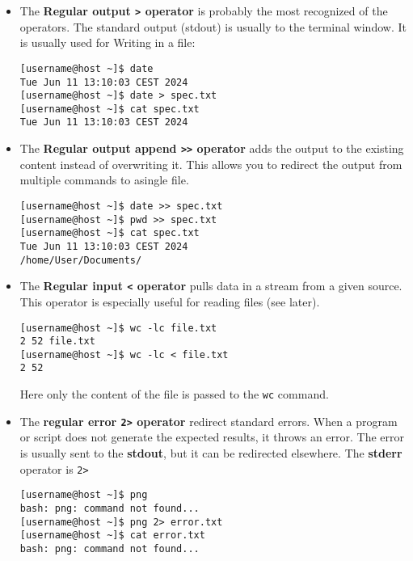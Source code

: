 \documentclass{article}
\newcommand{\inlinecode}[1]{\colorbox{backcolour}{\footnotesize{\texttt{#1}}}}
\begin{document}
\begin{itemize}
	\item The \textbf{Regular output \inlinecode{>} operator} is probably the most recognized of the operators. The standard output (stdout) is usually to the terminal window. It is usually used for Writing in a file:

	      \begin{lstlisting}[style=terminal]
[username@host ~]$ date
Tue Jun 11 13:10:03 CEST 2024
[username@host ~]$ date > spec.txt
[username@host ~]$ cat spec.txt
Tue Jun 11 13:10:03 CEST 2024
\end{lstlisting}

	\item The \textbf{Regular output append \inlinecode{>>} operator} adds the output to the existing content instead of overwriting it. This allows you to redirect the output from multiple commands to asingle file.

	      \begin{lstlisting}[style=terminal]
[username@host ~]$ date >> spec.txt
[username@host ~]$ pwd >> spec.txt
[username@host ~]$ cat spec.txt
Tue Jun 11 13:10:03 CEST 2024
/home/User/Documents/
\end{lstlisting}

	\item The \textbf{Regular input \inlinecode{<} operator} pulls data in a stream from a given source. This operator is especially useful for reading files (see later).
	      \begin{lstlisting}[style=terminal]
[username@host ~]$ wc -lc file.txt
2 52 file.txt
[username@host ~]$ wc -lc < file.txt
2 52
\end{lstlisting}

	      Here only the content of the file is passed to the \inlinecode{wc} command.

	\item The \textbf{regular error \inlinecode{2>} operator} redirect standard errors. When a program or script does not generate the expected results, it throws an error. The error is usually sent to the \textbf{stdout}, but it can be redirected elsewhere. The \textbf{stderr} operator is \inlinecode{2>}

	      \begin{lstlisting}[style=terminal]
[username@host ~]$ png
bash: png: command not found...
[username@host ~]$ png 2> error.txt
[username@host ~]$ cat error.txt
bash: png: command not found...
\end{lstlisting}


\end{itemize}
\end{document}
